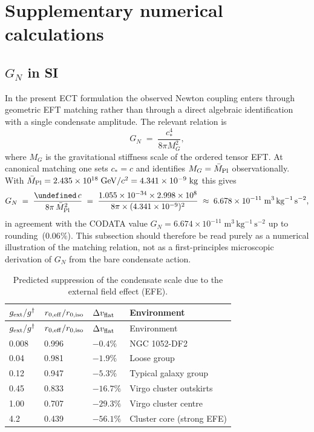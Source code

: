 \documentclass[11pt,a4paper]{article}
\let\hbar\undefined
\numberwithin{equation}{section}
\begin{document}
\section{Supplementary numerical calculations}
\label{app:supplementary}

\subsection{$G_N$ in SI}
In the present ECT formulation the observed Newton coupling enters through
geometric EFT matching rather than through a direct algebraic identification
with a single condensate amplitude.
The relevant relation is
\begin{equation}
  G_N \;=\; \frac{c_*^4}{8\pi M_G^2},
\end{equation}
where $M_G$ is the gravitational stiffness scale of the ordered tensor EFT.
At canonical matching one sets $c_*=c$ and identifies
$M_G=\bar M_{\rm Pl}$ observationally.
With $\bar{M}_{\rm Pl}=2.435\times10^{18}\;\mathrm{GeV}/c^2
=4.341\times10^{-9}\;\mathrm{kg}$ this gives
\begin{equation}
G_N \;=\; \frac{\hbar\,c}{8\pi\,\bar{M}_{\rm Pl}^2}
\;=\; \frac{1.055\times10^{-34}\times2.998\times10^{8}}
{8\pi\times(4.341\times10^{-9})^2}
\;\approx\; 6.678\times10^{-11}\;\mathrm{m^3\,kg^{-1}\,s^{-2}},
\end{equation}
in agreement with the CODATA value
$G_N = 6.674\times10^{-11}\;\mathrm{m^3\,kg^{-1}\,s^{-2}}$ up to rounding~($0.06\%$).
This subsection should therefore be read purely as a numerical
illustration of the matching relation, not as a first-principles
microscopic derivation of $G_N$ from the bare condensate action.

\begin{longtable}{@{}llll@{}}
\caption{Predicted suppression of the condensate scale due to the external field effect (EFE).}
\label{tab:EFE_predictions}\\

\toprule
$g_{\rm ext}/g^\dagger$ &
$r_{0,\rm eff}/r_{0,\rm iso}$ &
$\Delta v_{\rm flat}$ &
Environment \\
\midrule
\endfirsthead

\toprule
$g_{\rm ext}/g^\dagger$ &
$r_{0,\rm eff}/r_{0,\rm iso}$ &
$\Delta v_{\rm flat}$ &
Environment \\
\midrule
\endhead

0.008 & 0.996 & $-0.4\%$ & NGC 1052-DF2 \cite{vanDokkum2018} \\
0.04 & 0.981 & $-1.9\%$ & Loose group \\
0.12 & 0.947 & $-5.3\%$ & Typical galaxy group \\
0.45 & 0.833 & $-16.7\%$ & Virgo cluster outskirts \\
1.00 & 0.707 & $-29.3\%$ & Virgo cluster centre \\
4.2 & 0.439 & $-56.1\%$ & Cluster core (strong EFE) \\

\bottomrule
\end{longtable}
\end{document}
